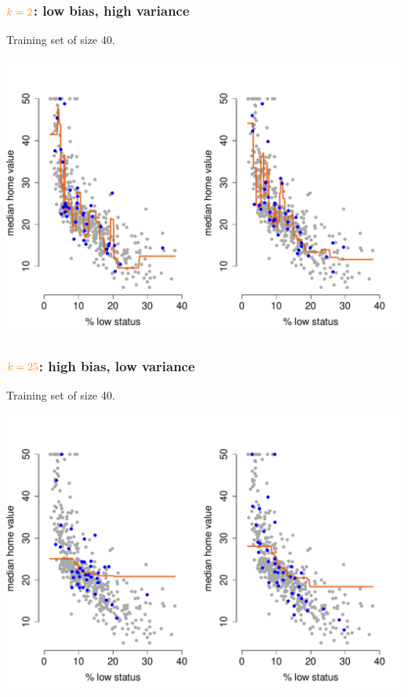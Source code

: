 \documentclass{beamer}
\newcommand{\bo}[1]{\textcolor{burntorange}{#1}}
\begin{document}
\begin{frame}[plain]
\frametitle{$\bo{k=2}$: low bias, high variance}
\vspace{4mm}
Training set of size 40.  
\vspace{-10mm}
\begin{center}
\includegraphics[scale=.43]{DaveBostonplotk2BVTrade1}
\end{center}
\end{frame}

\begin{frame}[plain]
\frametitle{$\bo{k=25}$: high bias, low variance}
\vspace{4mm}
Training set of size 40.
\vspace{-10mm}
\begin{center}
\includegraphics[scale=.43]{DaveBostonplotk25BVTrade1}
\end{center}
\end{frame}
\end{document}
